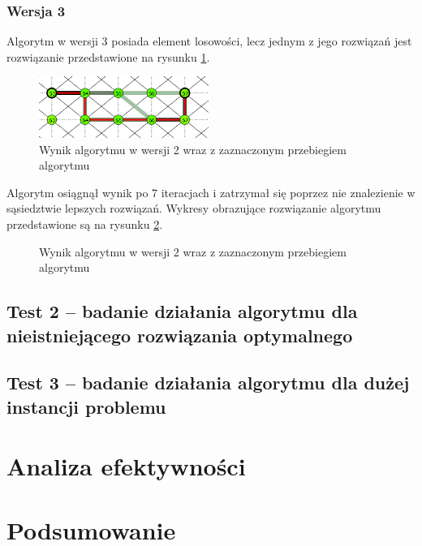 \documentclass[12pt,a4paper]{article}
\begin{document}
\subsubsection{Wersja 3}
Algorytm w wersji 3 posiada element losowości, lecz jednym z jego rozwiązań jest rozwiązanie przedstawione na rysunku \ref{test1_3}.
\begin{figure}[!h]
	\includegraphics[height=20mm]{./ilustracje/test12.png}
	\caption{Wynik algorytmu w wersji 2 wraz z zaznaczonym przebiegiem algorytmu}
	\label{test1_3}
\end{figure}
Algorytm osiągnął wynik po 7 iteracjach i zatrzymał się poprzez nie znalezienie w sąsiedztwie lepszych rozwiązań. Wykresy obrazujące rozwiązanie algorytmu przedstawione są na rysunku \ref{test1_graf3}.
\begin{figure}[!h]
	\centering
	\caption{Wynik algorytmu w wersji 2 wraz z zaznaczonym przebiegiem algorytmu}
	\label{test1_graf3}
\end{figure}

\subsection{Test 2 -- badanie działania algorytmu dla nieistniejącego rozwiązania optymalnego}

\subsection{Test 3 -- badanie działania algorytmu dla dużej instancji problemu}

\section{Analiza efektywności}
\section{Podsumowanie}
\end{document}
